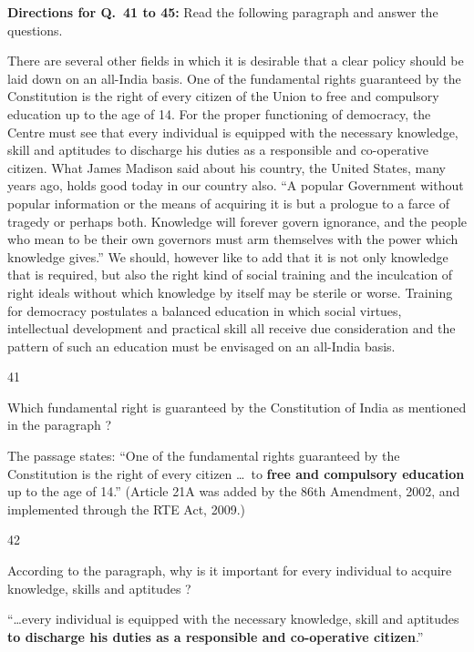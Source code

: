 \begin{context}
\textbf{Directions for Q.~41 to 45:} Read the following paragraph and answer the questions.\par\smallskip
There are several other fields in which it is desirable that a clear policy should be laid down on an all-India basis. One of the fundamental rights guaranteed by the Constitution is the right of every citizen of the Union to free and compulsory education up to the age of 14. For the proper functioning of democracy, the Centre must see that every individual is equipped with the necessary knowledge, skill and aptitudes to discharge his duties as a responsible and co-operative citizen. What James Madison said about his country, the United States, many years ago, holds good today in our country also. ``A popular Government without popular information or the means of acquiring it is but a prologue to a farce of tragedy or perhaps both. Knowledge will forever govern ignorance, and the people who mean to be their own governors must arm themselves with the power which knowledge gives.'' We should, however like to add that it is not only knowledge that is required, but also the right kind of social training and the inculcation of right ideals without which knowledge by itself may be sterile or worse. Training for democracy postulates a balanced education in which social virtues, intellectual development and practical skill all receive due consideration and the pattern of such an education must be envisaged on an all-India basis.
\end{context}
\begin{question}{41}
{Which fundamental right is guaranteed by the Constitution of India as mentioned in the paragraph ?\par}
\begin{explain}
The passage states: ``One of the fundamental rights guaranteed by the Constitution is the right of every citizen \ldots\ to \textbf{free and compulsory education} up to the age of 14.'' (Article 21A was added by the 86th Amendment, 2002, and implemented through the RTE Act, 2009.)
\end{explain}
\end{question}

\begin{question}{42}
{According to the paragraph, why is it important for every individual to acquire knowledge, skills and aptitudes ?\par}
\begin{explain}
``\ldots every individual is equipped with the necessary knowledge, skill and aptitudes \textbf{to discharge his duties as a responsible and co-operative citizen}.''
\end{explain}
\end{question}

